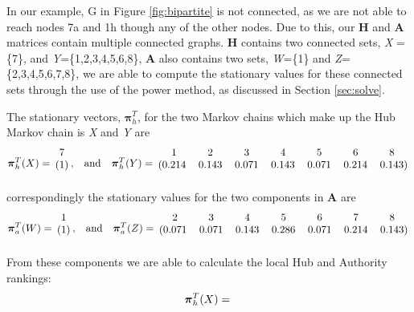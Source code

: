 \documentclass[11pt]{report}
\begin{document}
{In our example, G in Figure \ref{fig:bipartite} is not connected, as we are not able to reach nodes 7a and 1h though any of the other nodes. Due to this, our \textbf{H} and \textbf{A} matrices contain multiple connected graphs. \textbf{H} contains two connected sets, \textit{X} = \{7\}, and \textit{Y}=\{1,2,3,4,5,6,8\}, \textbf{A} also contains two sets, \textit{W}=\{1\} and \textit{Z}=\{2,3,4,5,6,7,8\}, we are able to compute the stationary values for these connected sets through the use of the power method, as discussed in Section \ref{sec:solve}.

The stationary vectors, $\boldsymbol\pi_h^T$, for the two Markov chains which make up the Hub Markov chain is \textit{X} and \textit{Y} are 
\[\boldsymbol\pi_h^T (X) = \begin{blockarray}{c}
7 \\
\begin{block}{(c)}
 1 \\
\end{block}
\end{blockarray} \mathrm{,}\quad\mathrm{and}\quad
\boldsymbol\pi_h^T (Y) =
\begin{blockarray}{ccccccc}
1 & 2 & 3 & 4 & 5 & 6 & 8 \\
\begin{block}{(ccccccc)}
 0.214 & 0.143 & 0.071 & 0.143 & 0.071 & 0.214 & 0.143 \\
\end{block}
\end{blockarray} \] correspondingly the stationary values for the two components in \textbf{A} are
\[\boldsymbol\pi_a^T (W) = \begin{blockarray}{c}
1 \\
\begin{block}{(c)}
 1 \\
\end{block}
\end{blockarray} \mathrm{,}\quad\mathrm{and}\quad
\boldsymbol\pi_a^T (Z) = \begin{blockarray}{ccccccc}
2 & 3 & 4 & 5 & 6 & 7 & 8 \\
\begin{block}{(ccccccc)}
0.071 & 0.071 & 0.143 & 0.286 & 0.071 & 0.214 & 0.143 \\
\end{block}
\end{blockarray}\]
From these components we are able to calculate the local Hub and Authority rankings:
\[\boldsymbol\pi_h^T (X) = \begin{blockarray}{c}

\end{blockarray}\]}
\end{document}
